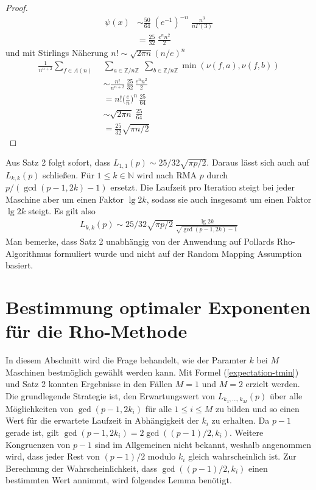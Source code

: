 \documentclass[a4paper, 10pt, ngerman]{article}
\newcommand{\N}{\mathbb{N}}
\newcommand{\Z}{\mathbb{Z}}
\begin{document}
\begin{proof}
\begin{align*}
        [x^n] \psi(x)
         & \sim \frac {50} {64} \; (e^{-1})^{-n} \;
        \frac {n^3} {n \Gamma(3)}                   \\
         & = \frac {25} {32} \; \frac {e^n n^2} {2}
    \end{align*}
    und mit Stirlings Näherung $n! \sim \sqrt{2\pi n} (n/e)^n$
    \begin{align*}
        \frac 1 {n^{n + 2}} \sum_{f \in A(n)} \;
         & \sum_{a \in \Z/n\Z} \; \sum_{b \in \Z/n\Z}
        \min(\nu(f, a), \nu(f, b))                                           \\
         & \sim \frac {n!}{n^{n + 2}} \, \frac {25} {32} \,\frac {e^n n^2} 2 \\
         & = n! \bigg (\frac {e} {n} \bigg )^n \, \frac {25} {64}            \\
         & \sim \sqrt {2 \pi n} \; \frac {25}{64}                            \\
         & = \frac {25} {32} \sqrt{\pi n/2}
    \end{align*}
\end{proof}

\noindent Aus Satz 2 folgt sofort, dass $L_{1, 1}(p) \sim 25/32 \sqrt{\pi p / 2}$. Daraus lässt sich auch auf $L_{k, k}(p)$ schließen. Für $1 \le k \in \N$ wird nach RMA $p$ durch $p/(\gcd(p - 1, 2k) - 1)$ ersetzt. Die Laufzeit pro Iteration steigt bei jeder Maschine aber um einen Faktor $\lg 2k$, sodass sie auch insgesamt um einen Faktor $\lg 2k$ steigt. Es gilt also
\begin{align}
    L_{k, k}(p) \sim 25 / 32 \sqrt{\pi p /2} \
    \frac {\lg 2k} {\sqrt{\gcd(p - 1, 2k) - 1}}
    \label{lkkp}
\end{align}
Man bemerke, dass Satz 2 unabhängig von der Anwendung auf Pollards Rho-Algorithmus formuliert wurde und nicht auf der Random Mapping Assumption basiert.

\section{Bestimmung optimaler Exponenten für die Rho-Methode}
\label{sec:optimal-k}

In diesem Abschnitt wird die Frage behandelt, wie der Paramter $k$ bei $M$ Maschinen bestmöglich gewählt werden kann. Mit Formel (\ref{expectation-tmin}) und Satz 2 konnten Ergebnisse in den Fällen $M = 1$ und $M = 2$ erzielt werden. Die grundlegende Strategie ist, den Erwartungswert von $L_{k_1, \dots, k_M}(p)$ über alle Möglichkeiten von $\gcd(p - 1, 2k_i)$ für alle $1 \le i \le M$ zu bilden und so einen Wert für die erwartete Laufzeit in Abhängigkeit der $k_i$ zu erhalten. Da $p - 1$ gerade ist, gilt $\gcd(p-1, 2k_i) = 2\gcd((p - 1)/2, k_i)$. Weitere Kongruenzen von $p - 1$ sind im Allgemeinen nicht bekannt, weshalb angenommen wird, dass jeder Rest von $(p- 1)/2$ modulo $k_i$ gleich wahrscheinlich ist. Zur Berechnung der Wahrscheinlichkeit, dass $\gcd((p - 1)/2, k_i)$ einen bestimmten Wert annimmt, wird folgendes Lemma benötigt.
\end{document}
